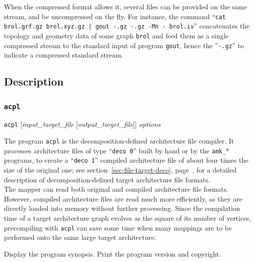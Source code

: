 When the compressed format allows it, several files can be provided on
the same stream, and be uncompressed on the fly. For instance, the
command ``\texttt{cat brol.grf.gz brol.xyz.gz | gout -.gz -.gz -Mn -
brol.iv}'' concatenates the topology and geometry data of some graph
\texttt{brol} and feed them as a single compressed stream to the standard
input of program \texttt{gout}, hence the ''\texttt{-.gz}'' to indicate a
compressed standard stream.

\subsection{Description}

\subsubsection{\texttt{acpl}}

\begin{itemize}
\progsyn
\texttt{acpl} [{\it input\_target\_file} [{\it output\_target\_file}]] {\it options}

\progdes
The program \texttt{acpl} is the decomposition-defined architecture file compiler.
It processes architecture files of type ``\texttt{deco~0}'' built by hand or by
the \texttt{amk\_}* programs, to create a ``\texttt{deco~1}'' compiled
architecture file of about four times the size of the original one;
see section~\ref{sec-file-target-deco}, page~\pageref{sec-file-target-deco},
for a detailed description of decomposition-defined target
architecture file formats.
\\
The mapper can read both original and compiled architecture file formats.
However, compiled architecture files are read much more efficiently, as
they are directly loaded into memory without further processing.
Since the compilation time of a target architecture graph evolves
as the square of its number of vertices, precompiling with \texttt{acpl} can
save some time when many mappings are to be performed onto the same large
target architecture.

\progopt
\begin{itemize}
\iteme[\texttt{-h}]
Display the program synopsis.
\iteme[\texttt{-V}]
Print the program version and copyright.
\end{itemize}
\end{itemize}


